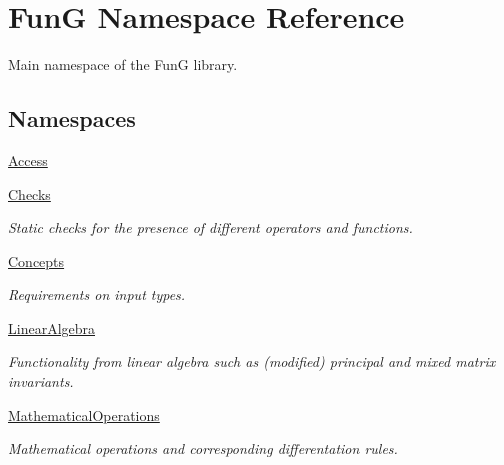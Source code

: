 \hypertarget{namespaceFunG}{\section{Fun\-G Namespace Reference}
\label{namespaceFunG}
}


Main namespace of the Fun\-G library.  


\subsection*{Namespaces}
\begin{DoxyCompactItemize}
\item 
\hyperlink{namespaceFunG_1_1Access}{Access}
\item 
\hyperlink{namespaceFunG_1_1Checks}{Checks}
\begin{DoxyCompactList}\small\item\em Static checks for the presence of different operators and functions. \end{DoxyCompactList}\item 
\hyperlink{namespaceFunG_1_1Concepts}{Concepts}
\begin{DoxyCompactList}\small\item\em Requirements on input types. \end{DoxyCompactList}\item 
\hyperlink{namespaceFunG_1_1LinearAlgebra}{Linear\-Algebra}
\begin{DoxyCompactList}\small\item\em Functionality from linear algebra such as (modified) principal and mixed matrix invariants. \end{DoxyCompactList}\item 
\hyperlink{namespaceFunG_1_1MathematicalOperations}{Mathematical\-Operations}
\begin{DoxyCompactList}\small\item\em Mathematical operations and corresponding differentation rules. \end{DoxyCompactList}\end{DoxyCompactItemize}
